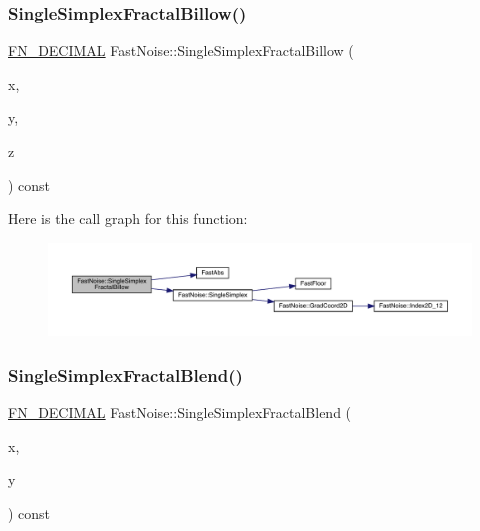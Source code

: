 \subsubsection{\texorpdfstring{Single\+Simplex\+Fractal\+Billow()}{SingleSimplexFractalBillow()}\hspace{0.1cm}{\footnotesize\ttfamily [2/2]}}
{\footnotesize\ttfamily \mbox{\hyperlink{_fast_noise_8h_a75a9ef6d2541c4921815b885bfd449c3}{F\+N\+\_\+\+D\+E\+C\+I\+M\+AL}} Fast\+Noise\+::\+Single\+Simplex\+Fractal\+Billow (\begin{DoxyParamCaption}\item[{\mbox{\hyperlink{_fast_noise_8h_a75a9ef6d2541c4921815b885bfd449c3}{F\+N\+\_\+\+D\+E\+C\+I\+M\+AL}}}]{x,  }\item[{\mbox{\hyperlink{_fast_noise_8h_a75a9ef6d2541c4921815b885bfd449c3}{F\+N\+\_\+\+D\+E\+C\+I\+M\+AL}}}]{y,  }\item[{\mbox{\hyperlink{_fast_noise_8h_a75a9ef6d2541c4921815b885bfd449c3}{F\+N\+\_\+\+D\+E\+C\+I\+M\+AL}}}]{z }\end{DoxyParamCaption}) const\hspace{0.3cm}{\ttfamily [private]}}

Here is the call graph for this function\+:
\nopagebreak
\begin{figure}[H]
\begin{center}
\leavevmode
\includegraphics[width=350pt]{class_fast_noise_a6dd57ba17192a085544452db30caaf64_cgraph}
\end{center}
\end{figure}
\mbox{\label{class_fast_noise_af076ea4b492ce8e166816c5842ce43da}} 
\subsubsection{\texorpdfstring{Single\+Simplex\+Fractal\+Blend()}{SingleSimplexFractalBlend()}}
{\footnotesize\ttfamily \mbox{\hyperlink{_fast_noise_8h_a75a9ef6d2541c4921815b885bfd449c3}{F\+N\+\_\+\+D\+E\+C\+I\+M\+AL}} Fast\+Noise\+::\+Single\+Simplex\+Fractal\+Blend (\begin{DoxyParamCaption}\item[{\mbox{\hyperlink{_fast_noise_8h_a75a9ef6d2541c4921815b885bfd449c3}{F\+N\+\_\+\+D\+E\+C\+I\+M\+AL}}}]{x,  }\item[{\mbox{\hyperlink{_fast_noise_8h_a75a9ef6d2541c4921815b885bfd449c3}{F\+N\+\_\+\+D\+E\+C\+I\+M\+AL}}}]{y }\end{DoxyParamCaption}) const\hspace{0.3cm}{\ttfamily [private]}}

